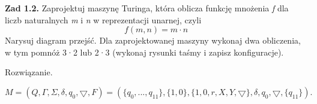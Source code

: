 \documentclass[12pt]{article}
\begin{document}
\begin{Parallel}{0.48\textwidth}{0.5\textwidth}

\end{Parallel}

\newpage

\noindent\textbf{Zad 1.2.} Zaprojektuj maszynę Turinga, która oblicza funkcję mnożenia \textit{f} dla liczb naturalnych \textit{m} i \textit{n} w reprezentacji unarnej, czyli
\[f(m,n)=m \cdot n\]
Narysuj diagram przejść. Dla zaprojektowanej maszyny wykonaj dwa obliczenia, w tym pomnóż 3·2 lub 2·3 (wykonaj rysunki taśmy i zapisz konfiguracje).

 Rozwiązanie.
 
\[M=(Q,\Gamma,\Sigma,\delta,q_0,\bigtriangledown,F)=(\{q_0, ... ,q_{11}\},\{1,0\},\{1,0,r,X,Y,\bigtriangledown\},\delta,q_0,\bigtriangledown,\{q_{11}\}).\]
\end{document}
